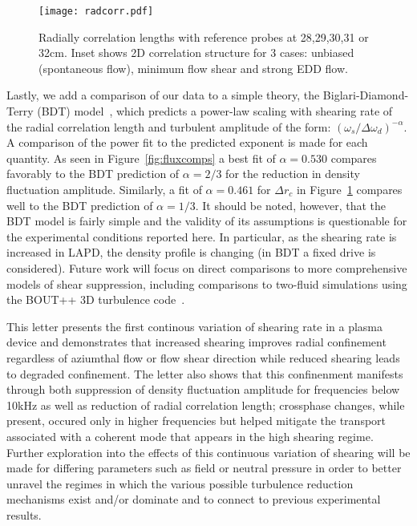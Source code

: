 \documentclass[aps,prl,amsmath,amssymb,preprint,superscriptaddress]{revtex4}
\begin{document}
\begin{figure}[!htbp]
\centerline{
\texttt{[image: radcorr.pdf]}}
\caption{\label{fig:radcorr} Radially correlation lengths with
  reference probes at 28,29,30,31 or 32cm. Inset shows 2D correlation
  structure for 3 cases: unbiased (spontaneous flow), minimum flow
  shear and strong EDD flow.}
\end{figure}

Lastly, we add a comparison of our data to a simple theory, the
Biglari-Diamond-Terry (BDT) model~\cite{biglari90}, which predicts a
power-law scaling with shearing rate of the radial correlation length and turbulent
amplitude of the form: $\left(\omega_{s}/\Delta
\omega_{d}\right)^{-\alpha}$. A comparison of the power fit to the
predicted exponent is made for each quantity. As seen in
Figure~\ref{fig:fluxcomps} a best fit of $\alpha = 0.530$ compares
favorably to the BDT prediction of $\alpha = 2/3$ for the reduction in
density fluctuation amplitude. Similarly, a fit of $\alpha = 0.461$
for $\Delta r_{c}$ in Figure~\ref{fig:radcorr} compares well to the BDT
prediction of $\alpha = 1/3$.   It should be noted, however, that the
BDT model is fairly simple and the validity of its assumptions is
questionable for the experimental conditions reported here.  In
particular, as the shearing rate is increased in LAPD, the density
profile is changing (in BDT a fixed drive is considered).  Future work
will focus on direct comparisons to more comprehensive models of shear
suppression, including comparisons to two-fluid simulations using the
BOUT++ 3D turbulence code~\cite{umansky11}.  

This letter presents the first continous variation of shearing rate in a plasma device and demonstrates that increased shearing improves radial confinement regardless of aziumthal flow or flow shear direction while reduced shearing leads to degraded confinement. The letter also shows that this confinenment manifests through both suppression of density fluctuation amplitude for frequencies below 10kHz as well as reduction of radial correlation length; crossphase changes, while present, occured only in higher frequencies but helped mitigate the transport associated with a coherent mode that appears in the high shearing regime. Further exploration into the effects of this continuous variation of shearing will be made for differing parameters such as field or neutral pressure in order to better unravel the regimes in which the various possible turbulence reduction mechanisms exist and/or dominate and to connect to previous experimental results.
\end{document}
